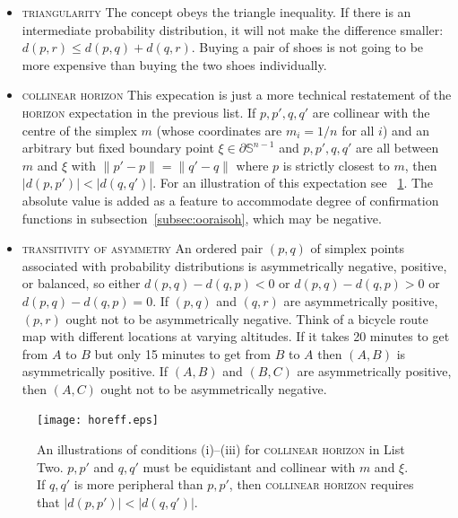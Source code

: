 \documentclass[phd,12pt,oneside]{ubcthesis}
\begin{document}
\begin{itemize}
\item \textsc{triangularity} The concept obeys the triangle
  inequality. If there is an intermediate probability distribution, it
  will not make the difference smaller: $d(p,r)\leq{}d(p,q)+d(q,r)$.
  Buying a pair of shoes is not going to be more expensive than buying
  the two shoes individually.
\item \textsc{collinear horizon} This expecation is just a more
  technical restatement of the \textsc{horizon} expectation in the
  previous list. If $p,p',q,q'$ are collinear with the centre of the
  simplex $m$ (whose coordinates are $m_{i}=1/n$ for all $i$) and an
  arbitrary but fixed boundary point $\xi\in\partial\mathbb{S}^{n-1}$
  and $p,p',q,q'$ are all between $m$ and $\xi$ with
  $\|p'-p\|=\|q'-q\|$ where $p$ is strictly closest to $m$, then
  $|d(p,p')|<|d(q,q')|$. For an illustration of this expectation see
  {\igure}~\ref{fig:conditions}. The absolute value is added as a
  feature to accommodate degree of confirmation functions in
  subsection~\ref{subsec:ooraisoh}, which may be negative.
\item \textsc{transitivity of asymmetry} An ordered pair $(p,q)$ of
  simplex points associated with probability distributions is
  asymmetrically negative, positive, or balanced, so either
  $d(p,q)-d(q,p)<0$ or $d(p,q)-d(q,p)>0$ or $d(p,q)-d(q,p)=0$. If
  $(p,q)$ and $(q,r)$ are asymmetrically positive, $(p,r)$ ought not
  to be asymmetrically negative. Think of a bicycle route map with
  different locations at varying altitudes. If it takes 20 minutes to
  get from $A$ to $B$ but only 15 minutes to get from $B$ to $A$ then
  $(A,B)$ is asymmetrically positive. If $(A,B)$ and $(B,C)$ are
  asymmetrically positive, then $(A,C)$ ought not to be asymmetrically
  negative.
\end{itemize}

\begin{figure}[ht!]
    \begin{minipage}[h]{.7\linewidth}
      \texttt{[image: horeff.eps]}
      \caption{\footnotesize An illustrations of conditions (i)--(iii)
        for \textsc{collinear horizon} in List Two. $p,p'$ and $q,q'$
        must be equidistant and collinear with $m$ and $\xi$. If
        $q,q'$ is more peripheral than $p,p'$, then \textsc{collinear
          horizon} requires that $|d(p,p')|<|d(q,q')|$.}
      \label{fig:conditions}
    \end{minipage}
\end{figure}
\end{document}
